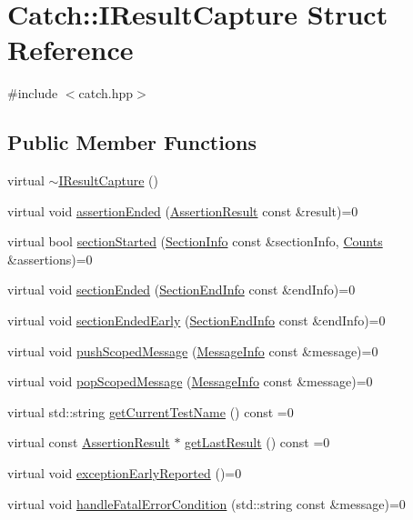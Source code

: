 \hypertarget{structCatch_1_1IResultCapture}{\section{Catch\-:\-:I\-Result\-Capture Struct Reference}
\label{structCatch_1_1IResultCapture}
}


{\ttfamily \#include $<$catch.\-hpp$>$}

\subsection*{Public Member Functions}
\begin{DoxyCompactItemize}
\item 
virtual \hyperlink{structCatch_1_1IResultCapture_a3bd16719d6772b7470887fc36c6d0808}{$\sim$\-I\-Result\-Capture} ()
\item 
virtual void \hyperlink{structCatch_1_1IResultCapture_ae45e08bccc5fb434656d4f2e44742223}{assertion\-Ended} (\hyperlink{classCatch_1_1AssertionResult}{Assertion\-Result} const \&result)=0
\item 
virtual bool \hyperlink{structCatch_1_1IResultCapture_a5b76ed52badcb64cf374202e12b81a03}{section\-Started} (\hyperlink{structCatch_1_1SectionInfo}{Section\-Info} const \&section\-Info, \hyperlink{structCatch_1_1Counts}{Counts} \&assertions)=0
\item 
virtual void \hyperlink{structCatch_1_1IResultCapture_a4e152bc43dc0933684e31fa67a58195d}{section\-Ended} (\hyperlink{structCatch_1_1SectionEndInfo}{Section\-End\-Info} const \&end\-Info)=0
\item 
virtual void \hyperlink{structCatch_1_1IResultCapture_afcc71eef8ca821ae132cced4a2be6988}{section\-Ended\-Early} (\hyperlink{structCatch_1_1SectionEndInfo}{Section\-End\-Info} const \&end\-Info)=0
\item 
virtual void \hyperlink{structCatch_1_1IResultCapture_a91d154c1e087e383dcde5aad95cb6a05}{push\-Scoped\-Message} (\hyperlink{structCatch_1_1MessageInfo}{Message\-Info} const \&message)=0
\item 
virtual void \hyperlink{structCatch_1_1IResultCapture_a42bcb13276706bf8c3ce081ce16d37fd}{pop\-Scoped\-Message} (\hyperlink{structCatch_1_1MessageInfo}{Message\-Info} const \&message)=0
\item 
virtual std\-::string \hyperlink{structCatch_1_1IResultCapture_aea1617f4a84cc648246aa3ed6918b5bf}{get\-Current\-Test\-Name} () const =0
\item 
virtual const \hyperlink{classCatch_1_1AssertionResult}{Assertion\-Result} $\ast$ \hyperlink{structCatch_1_1IResultCapture_ab18872c89fab97405a56e9c6a4919736}{get\-Last\-Result} () const =0
\item 
virtual void \hyperlink{structCatch_1_1IResultCapture_ae63ecec95db4c236c63ecf616f483810}{exception\-Early\-Reported} ()=0
\item 
virtual void \hyperlink{structCatch_1_1IResultCapture_a7d995222301e6605f26549726b30c3ee}{handle\-Fatal\-Error\-Condition} (std\-::string const \&message)=0
\end{DoxyCompactItemize}


